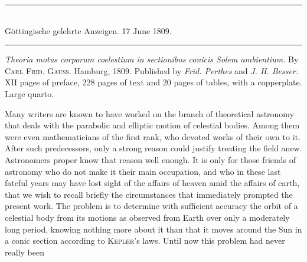 \begin{center}\rule{.75\textwidth}{.3pt}\\
Göttingische gelehrte Anzeigen. 17 June 1809.\\
\rule{.75\textwidth}{.3pt}\end{center}
\textit{Theoria motus corporum coelestium in sectionibus conicis Solem ambientium.} By \textsc{Carl Frid. Gauss.} Hamburg, 1809. Published by \textit{Frid. Perthes} and \textit{J. H. Besser.} XII pages of preface, 228 pages of text and 20 pages of tables, with a copperplate. Large quarto.

Many writers are known to have worked on the branch of theoretical astronomy that deals with the parabolic and elliptic motion of celestial bodies. Among them were even mathematicians of the first rank, who devoted works of their own to it. After such predecessors, only a strong reason could justify treating the field anew. Astronomers proper know that reason well enough. It is only for those friends of astronomy who do not make it their main occupation, and who in these last fateful years may have lost sight of the affairs of heaven amid the affairs of earth, that we wish to recall briefly the circumstances that immediately prompted the present work. The problem is to determine with sufficient accuracy the orbit of a celestial body from its motions as observed from Earth over only a moderately long period, knowing nothing more about it than that it moves around the Sun in a conic section according to \textsc{Kepler}’s laws. Until now this problem had never really been
